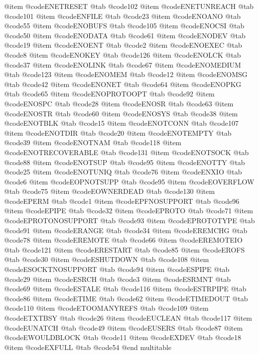 @item @code{ENETRESET}
@tab @code{102}
@item @code{ENETUNREACH}
@tab @code{101}
@item @code{ENFILE}
@tab @code{23}
@item @code{ENOANO}
@tab @code{55}
@item @code{ENOBUFS}
@tab @code{105}
@item @code{ENOCSI}
@tab @code{50}
@item @code{ENODATA}
@tab @code{61}
@item @code{ENODEV}
@tab @code{19}
@item @code{ENOENT}
@tab @code{2}
@item @code{ENOEXEC}
@tab @code{8}
@item @code{ENOKEY}
@tab @code{126}
@item @code{ENOLCK}
@tab @code{37}
@item @code{ENOLINK}
@tab @code{67}
@item @code{ENOMEDIUM}
@tab @code{123}
@item @code{ENOMEM}
@tab @code{12}
@item @code{ENOMSG}
@tab @code{42}
@item @code{ENONET}
@tab @code{64}
@item @code{ENOPKG}
@tab @code{65}
@item @code{ENOPROTOOPT}
@tab @code{92}
@item @code{ENOSPC}
@tab @code{28}
@item @code{ENOSR}
@tab @code{63}
@item @code{ENOSTR}
@tab @code{60}
@item @code{ENOSYS}
@tab @code{38}
@item @code{ENOTBLK}
@tab @code{15}
@item @code{ENOTCONN}
@tab @code{107}
@item @code{ENOTDIR}
@tab @code{20}
@item @code{ENOTEMPTY}
@tab @code{39}
@item @code{ENOTNAM}
@tab @code{118}
@item @code{ENOTRECOVERABLE}
@tab @code{131}
@item @code{ENOTSOCK}
@tab @code{88}
@item @code{ENOTSUP}
@tab @code{95}
@item @code{ENOTTY}
@tab @code{25}
@item @code{ENOTUNIQ}
@tab @code{76}
@item @code{ENXIO}
@tab @code{6}
@item @code{EOPNOTSUPP}
@tab @code{95}
@item @code{EOVERFLOW}
@tab @code{75}
@item @code{EOWNERDEAD}
@tab @code{130}
@item @code{EPERM}
@tab @code{1}
@item @code{EPFNOSUPPORT}
@tab @code{96}
@item @code{EPIPE}
@tab @code{32}
@item @code{EPROTO}
@tab @code{71}
@item @code{EPROTONOSUPPORT}
@tab @code{93}
@item @code{EPROTOTYPE}
@tab @code{91}
@item @code{ERANGE}
@tab @code{34}
@item @code{EREMCHG}
@tab @code{78}
@item @code{EREMOTE}
@tab @code{66}
@item @code{EREMOTEIO}
@tab @code{121}
@item @code{ERESTART}
@tab @code{85}
@item @code{EROFS}
@tab @code{30}
@item @code{ESHUTDOWN}
@tab @code{108}
@item @code{ESOCKTNOSUPPORT}
@tab @code{94}
@item @code{ESPIPE}
@tab @code{29}
@item @code{ESRCH}
@tab @code{3}
@item @code{ESRMNT}
@tab @code{69}
@item @code{ESTALE}
@tab @code{116}
@item @code{ESTRPIPE}
@tab @code{86}
@item @code{ETIME}
@tab @code{62}
@item @code{ETIMEDOUT}
@tab @code{110}
@item @code{ETOOMANYREFS}
@tab @code{109}
@item @code{ETXTBSY}
@tab @code{26}
@item @code{EUCLEAN}
@tab @code{117}
@item @code{EUNATCH}
@tab @code{49}
@item @code{EUSERS}
@tab @code{87}
@item @code{EWOULDBLOCK}
@tab @code{11}
@item @code{EXDEV}
@tab @code{18}
@item @code{EXFULL}
@tab @code{54}
@end multitable

